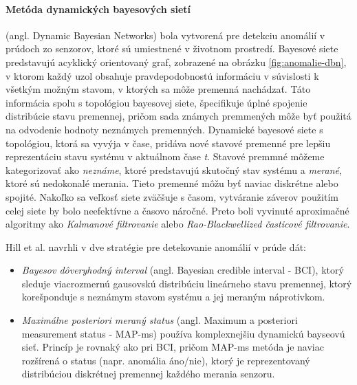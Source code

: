 \paragraph{Metóda dynamických bayesových sietí} (angl. Dynamic Bayesian Networks) \citep{hill2007real} bola vytvorená pre detekciu anomálií v prúdoch zo senzorov, ktoré sú umiestnené v životnom prostredí. Bayesové siete predstavujú acyklický orientovaný graf, zobrazené na obrázku \ref{fig:anomalie-dbn}, v ktorom každý uzol obsahuje pravdepodobnostú informáciu v súvislosti k všetkým možným stavom, v ktorých sa môže premenná nachádzať. Táto informácia spolu s topológiou bayesovej siete, špecifikuje úplné spojenie distribúcie stavu premennej, pričom sada známych premmených môže byť použitá na odvodenie hodnoty neznámych premenných. Dynamické bayesové siete s topológiou, ktorá sa vyvýja v čase, pridáva nové stavové premenné pre lepšiu reprezentáciu stavu systému v aktuálnom čase \textit{t}. Stavové premmné môžeme kategorizovať ako \textit{neznáme}, ktoré predstavujú skutočný stav systému a \textit{merané}, ktoré sú nedokonalé merania. Tieto premenné môžu byť naviac diskrétne alebo spojité. Nakoľko sa veľkosť siete zväčšuje s časom, vytváranie záverov použitím celej siete by bolo neefektívne a časovo náročné. Preto boli vyvinuté aproximačné algoritmy ako \textit{Kalmanové filtrovanie} alebo \textit{Rao-Blackwellized časticové filtrovanie}. \par
Hill et al. navrhli v \citep{hill2007real} dve stratégie pre detekovanie anomálií v prúde dát:
\begin{itemize}
	\item \textit{Bayesov dôveryhodný interval} (angl. Bayesian credible interval - BCI), ktorý sleduje viacrozmernú gausovskú distribúciu lineárneho stavu premennej, ktorý korešponduje s neznámym stavom systému a jej meraným náprotivkom.
	\item \textit{Maximálne posteriori meraný status} (angl. Maximum a posteriori measurement status - MAP-ms) používa komplexnejšiu dynamickú bayseovú sieť. Princíp je rovnaký ako pri BCI, pričom MAP-ms metóda je naviac rozšírená o status (napr. anomália áno/nie), ktorý je reprezentovaný distribúciou diskrétnej premennej každého merania senzoru.
\end{itemize}
\label{fig:anomalie-dbn}


